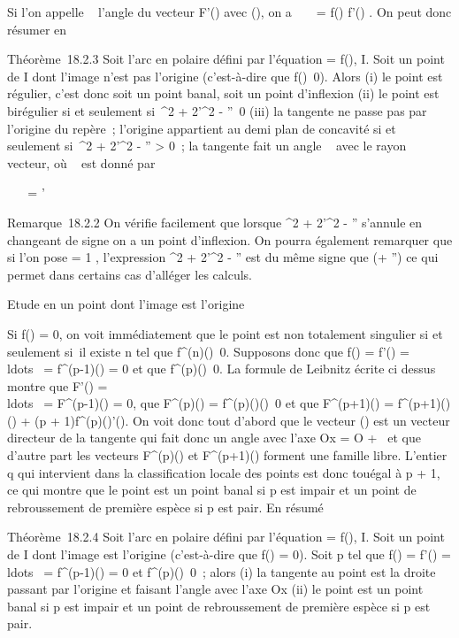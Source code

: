 \documentclass[]{article}
\begin{document}
Si l'on appelle \alpha~ l'angle du vecteur F'(\theta) avec
\vecu(\theta), on a
\mathrmtg~ \alpha~ = f(\theta)
\over f'(\theta) . On peut donc résumer en

Théorème~18.2.3 Soit \Gamma l'arc en polaire défini par l'équation \rho = f(\theta),
\theta \in I. Soit \theta un point de I dont l'image n'est pas l'origine
(c'est-à-dire que f(\theta)\neq~0). Alors (i) le point
est régulier, c'est donc soit un point banal, soit un point d'inflexion
(ii) le point est birégulier si et seulement si~\rho^2 +
2\rho'^2 - \rho\rho''\neq~0 (iii) la tangente
ne passe pas par l'origine du repère~; l'origine appartient au demi plan
de concavité si et seulement si~\rho^2 + 2\rho'^2 - \rho\rho''
\textgreater{} 0~; la tangente fait un angle \alpha~ avec le rayon vecteur, où
\alpha~ est donné par

\mathrmtg~ \alpha~ = \rho
\over \rho'

Remarque~18.2.2 On vérifie facilement que lorsque \rho^2 +
2\rho'^2 - \rho\rho'' s'annule en changeant de signe on a un point
d'inflexion. On pourra également remarquer que si l'on pose \phi = 1
\over \rho , l'expression \rho^2 +
2\rho'^2 - \rho\rho'' est du même signe que \phi(\phi + \phi'') ce qui permet
dans certains cas d'alléger les calculs.

Etude en un point dont l'image est l'origine

Si f(\theta) = 0, on voit immédiatement que le point est non totalement
singulier si et seulement si~il existe n tel que
f^(n)(\theta)\neq~0. Supposons donc que
f(\theta) = f'(\theta) =
\\ldots~ =
f^(p-1)(\theta) = 0 et que
f^(p)(\theta)\neq~0. La formule de Leibnitz
écrite ci dessus montre que F'(\theta) =
\\ldots~ =
F^(p-1)(\theta) = 0, que F^(p)(\theta) =
f^(p)(\theta)\vecu(\theta)\neq~0
et que F^(p+1)(\theta) =
f^(p+1)(\theta)\vecu(\theta) + (p +
1)f^(p)(\theta)\vecu'(\theta). On voit donc tout
d'abord que le vecteur \vecu(\theta) est un vecteur
directeur de la tangente qui fait donc un angle \theta avec l'axe Ox = O +
~\vec\imath et que d'autre part les vecteurs
F^(p)(\theta) et F^(p+1)(\theta) forment une famille libre.
L'entier q qui intervient dans la classification locale des points est
donc tou\jmathours égal à p + 1, ce qui montre que le point est un point
banal si p est impair et un point de rebroussement de première espèce si
p est pair. En résumé

Théorème~18.2.4 Soit \Gamma l'arc en polaire défini par l'équation \rho = f(\theta),
\theta \in I. Soit \theta un point de I dont l'image est l'origine (c'est-à-dire que
f(\theta) = 0). Soit p tel que f(\theta) = f'(\theta) =
\\ldots~ =
f^(p-1)(\theta) = 0 et
f^(p)(\theta)\neq~0~; alors (i) la tangente
au point \theta est la droite passant par l'origine et faisant l'angle \theta avec
l'axe Ox (ii) le point est un point banal si p est impair et un point de
rebroussement de première espèce si p est pair.
\end{document}
